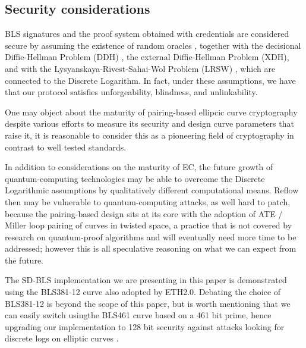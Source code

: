 \documentclass[conference]{IEEEtran}
\begin{document}
\subsection{Security considerations}

BLS signatures and the proof system obtained with credentials are
considered secure by assuming the existence of random oracles
\cite{random-oracle}, together with the decisional Diffie-Hellman
Problem (DDH) \cite{DDH-problem}, the external Diffie-Hellman Problem
(XDH), and with the Lysyanskaya-Rivest-Sahai-Wol Problem (LRSW)
\cite{lrsw-assumption}, which are connected to the Discrete
Logarithm. In fact, under these assumptions, we have that our protocol
satisfies unforgeability, blindness, and unlinkability.

One may object about the maturity of pairing-based ellipcic curve
cryptography despite various efforts to measure its security and
design curve parameters that raise it, it is reasonable to consider
this as a pioneering field of cryptography in contrast to well tested
standards.

In addition to considerations on the maturity of EC, the future growth
of quantum-computing technologies may be able to overcome the Discrete
Logarithmic assumptions by qualitatively different computational
means. Reflow then may be vulnerable to quantum-computing attacks, as
well hard to patch, because the pairing-based design sits at its core
with the adoption of ATE / Miller loop pairing of curves in twisted
space, a practice that is not covered by research on quantum-proof
algorithms and will eventually need more time to be addressed; however
this is all speculative reasoning on what we can expect from the
future.

The SD-BLS implementation we are presenting in this paper is
demonstrated using the BLS381-12 curve \cite{bls381-12} also adopted
by ETH2.0. Debating the choice of BLS381-12 is beyond the scope of
this paper, but is worth mentioning that we can easily switch usingthe
BLS461 curve based on a 461 bit prime, hence upgrading our
implementation to 128 bit security \cite{updating-key-pairings}
against attacks looking for discrete logs on elliptic curves
\cite{discrete-log-attack}.



\end{document}
